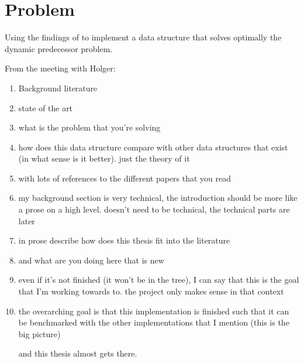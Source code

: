 \section{Problem}

Using the findings of \cite{patrascu2014dynamic} to implement a data structure that solves optimally the dynamic predecessor problem.











From the meeting with Holger:
\begin{enumerate}
    \item
    Background literature
    
    \item
    state of the art
    
    \item
    what is the problem that you're solving
    
    \item
    how does this data structure compare with other data structures that exist (in what sense is it better). just the theory of it
    
    \item
    with lots of references to the different papers that you read
    
    \item
    my background section is very technical, the introduction should be more like a prose on a high level. doesn't need to be technical, the technical parts are later
    
    \item
    in prose describe how does this thesis fit into the literature
    
    \item
    and what are you doing here that is new
    
    \item
    even if it's not finished (it won't be in the tree), I can say that this is the goal that I'm working towards to. the project only makes sense in that context
    
    \item
    the overarching goal is that this implementation is finished such that it can be benchmarked with the other implementations that I mention (this is the big picture)
    
    and this thesis almost gets there.
\end{enumerate}


